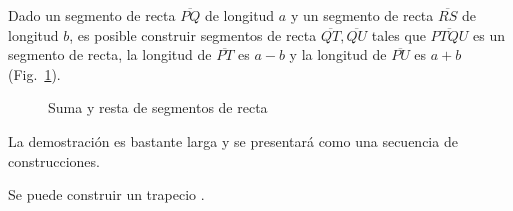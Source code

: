 \begin{theorem}\label{thm.add-subtract-mm}
Dado un segmento de recta $\overline{PQ}$ de longitud $a$ y un segmento de recta $\overline{RS}$ de longitud $b$, es posible construir segmentos de recta $\overline{QT}, \overline{QU}$ tales que $\overline{PTQU}$ es un segmento de recta, la longitud de $\overline{PT}$ es $a-b$ y la longitud de $\overline{PU}$ es $a+b$ (Fig.~\ref{f.compass-add1}).
\end{theorem}
\begin{figure}[ht]
\begin{center}
\end{center}
\caption{Suma y resta de segmentos de recta}\label{f.compass-add1}
\end{figure}

La demostración es bastante larga y se presentará como una secuencia de construcciones.

\begin{theorem}\label{thm.compass-trapezoid}
Se puede construir un trapecio .
\end{theorem}

